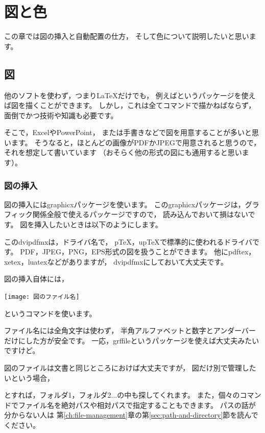 \chapter{図と色}
\label{ch:pictures}

この章では図の挿入と自動配置の仕方，
そして色について説明したいと思います。



\section{図}
\label{sec:insert-pictures}

他のソフトを使わず，つまり{\LaTeX}だけでも，
例えば{\TikZ}というパッケージを使えば図を描くことができます。
しかし，これは全てコマンドで描かねばならず，
面倒でかつ技術や知識も必要です。

そこで，ExcelやPowerPoint，
または手書きなどで図を用意することが多いと思います。
そうなると，ほとんどの画像がPDFかJPEGで用意されると思うので，
それを想定して書いています
（おそらく他の形式の図にも通用すると思います）。


\subsection{図の挿入}
図の挿入にはgraphicxパッケージを使います。
このgraphicxパッケージは，グラフィック関係全般で使えるパッケージですので，
読み込んでおいて損はないです。
図を挿入したいときは以下のようにします。


このdvipdfmxは，ドライバ名で，
{p\TeX}，{up\TeX}で標準的に使われるドライバです。
PDF，JPEG，PNG，EPS形式の図を扱うことができます。
他にpdftex，xetex，luatexなどがありますが，
dvipdfmxにしておいて大丈夫です。

図の挿入自体には，
\begin{ITeX}
\texttt{[image: 図のファイル名]}
\end{ITeX}
というコマンドを使います。

ファイル名には全角文字は使わず，
半角アルファベットと数字とアンダーバーだけにした方が安全です。
一応，grffileというパッケージを使えば大丈夫みたいですけど。

図のファイルは文書と同じところにおけば大丈夫ですが，
図だけ別で管理したいという場合，
とすれば，フォルダ1，フォルダ2...の中も探してくれます。
また，個々のコマンドでファイル名を絶対パスや相対パスで指定することもできます。
パスの話が分からない人は
第\ref{ch:file-management}章の第\ref{sec:path-and-directory}節を読んでください。

